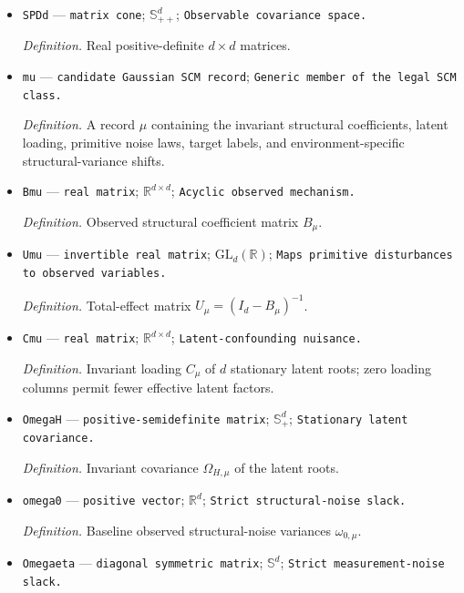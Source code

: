 \documentclass{article}
\begin{document}
\begin{itemize}
  \par\smallskip\noindent\emph{Definition.} Real symmetric \(d\times d\) matrices.
  \item \texttt{SPDd} --- \texttt{matrix cone}; \(\mathbb S_{++}^d\); \texttt{Observable covariance space.}
  \par\smallskip\noindent\emph{Definition.} Real positive-definite \(d\times d\) matrices.
  \item \texttt{mu} --- \texttt{candidate Gaussian SCM record}; \texttt{Generic member of the legal SCM class.}
  \par\smallskip\noindent\emph{Definition.} A record \(\mu\) containing the invariant structural coefficients, latent loading, primitive noise laws, target labels, and environment-specific structural-variance shifts.
  \item \texttt{Bmu} --- \texttt{real matrix}; \(\mathbb R^{d\times d}\); \texttt{Acyclic observed mechanism.}
  \par\smallskip\noindent\emph{Definition.} Observed structural coefficient matrix \(B_{\mu}\).
  \item \texttt{Umu} --- \texttt{invertible real matrix}; \(\mathrm{GL}_d(\mathbb R)\); \texttt{Maps primitive disturbances to observed variables.}
  \par\smallskip\noindent\emph{Definition.} Total-effect matrix \(U_{\mu}=(I_d-B_{\mu})^{-1}\).
  \item \texttt{Cmu} --- \texttt{real matrix}; \(\mathbb R^{d\times d}\); \texttt{Latent-\allowbreak{}confounding nuisance.}
  \par\smallskip\noindent\emph{Definition.} Invariant loading \(C_{\mu}\) of \(d\) stationary latent roots; zero loading columns permit fewer effective latent factors.
  \item \texttt{OmegaH} --- \texttt{positive-\allowbreak{}semidefinite matrix}; \(\mathbb S_{+}^{d}\); \texttt{Stationary latent covariance.}
  \par\smallskip\noindent\emph{Definition.} Invariant covariance \(\Omega_{H,\mu}\) of the latent roots.
  \item \texttt{omega0} --- \texttt{positive vector}; \(\mathbb R^d\); \texttt{Strict structural-\allowbreak{}noise slack.}
  \par\smallskip\noindent\emph{Definition.} Baseline observed structural-noise variances \(\omega_{0,\mu}\).
  \item \texttt{Omegaeta} --- \texttt{diagonal symmetric matrix}; \(\mathbb S^d\); \texttt{Strict measurement-\allowbreak{}noise slack.}

\end{itemize}
\end{document}
